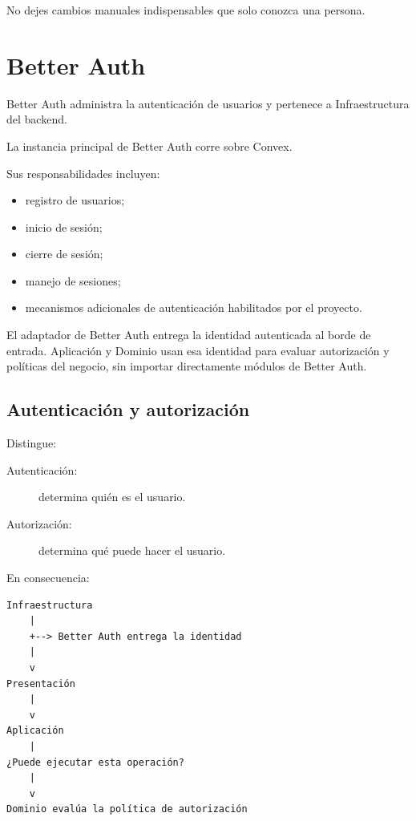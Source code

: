 \documentclass[11pt,a4paper]{article}
\begin{document}
No dejes cambios manuales indispensables que solo conozca una persona.

\section{Better Auth}

Better Auth administra la autenticación de usuarios y pertenece a
Infraestructura del backend.

La instancia principal de Better Auth corre sobre Convex.

Sus responsabilidades incluyen:

\begin{itemize}
  \item registro de usuarios;
  \item inicio de sesión;
  \item cierre de sesión;
  \item manejo de sesiones;
  \item mecanismos adicionales de autenticación habilitados por el proyecto.
\end{itemize}

El adaptador de Better Auth entrega la identidad autenticada al borde de
entrada. Aplicación y Dominio usan esa identidad para evaluar autorización y
políticas del negocio, sin importar directamente módulos de Better Auth.

\subsection{Autenticación y autorización}

Distingue:

\begin{description}
  \item[Autenticación:] determina quién es el usuario.
  \item[Autorización:] determina qué puede hacer el usuario.
\end{description}

En consecuencia:

\begin{lstlisting}
Infraestructura
    |
    +--> Better Auth entrega la identidad
    |
    v
Presentación
    |
    v
Aplicación
    |
¿Puede ejecutar esta operación?
    |
    v
Dominio evalúa la política de autorización
\end{lstlisting}
\end{document}
